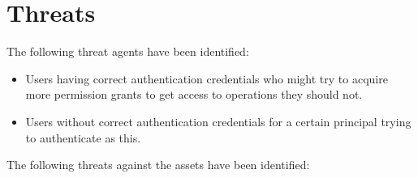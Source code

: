 \documentclass[12pt,english]{scrbook}
\begin{document}



\section{Threats}

The following threat agents have been identified:

\begin{itemize} 
  
  \item Users having correct authentication credentials who might try to
  acquire more permission grants to get access to operations they should not.

  \item Users without correct authentication credentials for a certain
  principal trying to authenticate as this.

\end{itemize}


The following threats against the assets have been identified:
\end{document}
